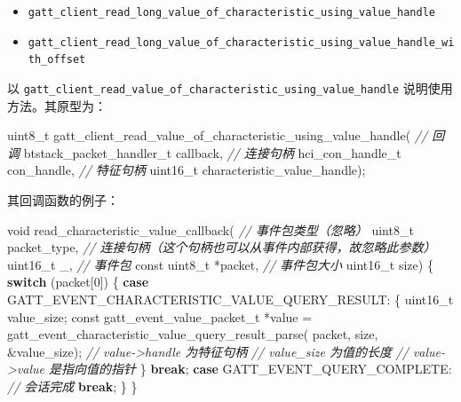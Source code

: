 \documentclass[
  12pt,
]{book}
\newenvironment{Shaded}{\begin{snugshade}}{\end{snugshade}}
\newcommand{\CommentTok}[1]{\textcolor[rgb]{0.56,0.35,0.01}{\textit{#1}}}
\newcommand{\ControlFlowTok}[1]{\textcolor[rgb]{0.13,0.29,0.53}{\textbf{#1}}}
\newcommand{\DataTypeTok}[1]{\textcolor[rgb]{0.13,0.29,0.53}{#1}}
\newcommand{\DecValTok}[1]{\textcolor[rgb]{0.00,0.00,0.81}{#1}}
\newcommand{\NormalTok}[1]{#1}
\providecommand{\tightlist}{%
  \setlength{\itemsep}{0pt}\setlength{\parskip}{0pt}}
\begin{document}
\begin{itemize}
\tightlist
\item
  \texttt{gatt\_client\_read\_long\_value\_of\_characteristic\_using\_value\_handle}
\item
  \texttt{gatt\_client\_read\_long\_value\_of\_characteristic\_using\_value\_handle\_with\_offset}
\end{itemize}

以 \texttt{gatt\_client\_read\_value\_of\_characteristic\_using\_value\_handle} 说明使用方法。其原型为：

\begin{Shaded}
\begin{Highlighting}[]
\DataTypeTok{uint8_t}\NormalTok{ gatt_client_read_value_of_characteristic_using_value_handle(}
  \CommentTok{// 回调}
\NormalTok{  btstack_packet_handler_t callback,}
  \CommentTok{// 连接句柄}
\NormalTok{  hci_con_handle_t con_handle,}
  \CommentTok{// 特征句柄}
  \DataTypeTok{uint16_t}\NormalTok{ characteristic_value_handle);}
\end{Highlighting}
\end{Shaded}

其回调函数的例子：

\begin{Shaded}
\begin{Highlighting}[]
\DataTypeTok{void}\NormalTok{ read_characteristic_value_callback(}
  \CommentTok{// 事件包类型（忽略）}
  \DataTypeTok{uint8_t}\NormalTok{ packet_type,}
  \CommentTok{// 连接句柄（这个句柄也可以从事件内部获得，故忽略此参数）}
  \DataTypeTok{uint16_t}\NormalTok{ _,}
  \CommentTok{// 事件包}
  \DataTypeTok{const} \DataTypeTok{uint8_t}\NormalTok{ *packet,}
  \CommentTok{// 事件包大小}
  \DataTypeTok{uint16_t}\NormalTok{ size)}
\NormalTok{\{}
    \ControlFlowTok{switch}\NormalTok{ (packet[}\DecValTok{0}\NormalTok{])}
\NormalTok{    \{}
    \ControlFlowTok{case}\NormalTok{ GATT_EVENT_CHARACTERISTIC_VALUE_QUERY_RESULT:}
\NormalTok{        \{}
            \DataTypeTok{uint16_t}\NormalTok{ value_size;}
            \DataTypeTok{const}\NormalTok{ gatt_event_value_packet_t *value =}
\NormalTok{                gatt_event_characteristic_value_query_result_parse(}
\NormalTok{                  packet, size, &value_size);}
            \CommentTok{// value->handle 为特征句柄}
            \CommentTok{// value_size 为值的长度}
            \CommentTok{// value->value 是指向值的指针}
\NormalTok{        \}}
        \ControlFlowTok{break}\NormalTok{;}
    \ControlFlowTok{case}\NormalTok{ GATT_EVENT_QUERY_COMPLETE:}
        \CommentTok{// 会话完成}
        \ControlFlowTok{break}\NormalTok{;}
\NormalTok{    \}}
\NormalTok{\}}
\end{Highlighting}
\end{Shaded}
\end{document}
